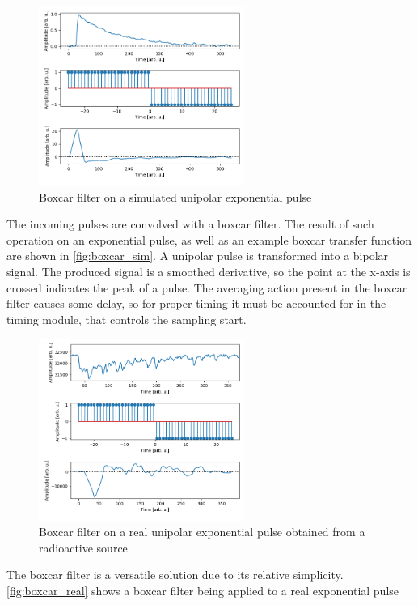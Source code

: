 \documentclass[12pt]{article}
\begin{document}
		\begin{figure}[!ht]
			\centering
			\includegraphics[width=0.60\textwidth]{img/boxcar_sim.png}
			\caption{Boxcar filter on a simulated unipolar exponential pulse}\label{fig:boxcar_sim}
		\end{figure}
		The incoming pulses are convolved with a boxcar filter. The result of such operation on 
		an exponential pulse, as well as an example boxcar transfer function are shown in \autoref{fig:boxcar_sim}.
		A unipolar pulse is transformed into a bipolar signal. The produced signal is a smoothed derivative, 
		so the point at the x-axis is crossed indicates the peak of a pulse.
		The averaging action present in the boxcar filter causes some delay, so for proper timing
		it must be accounted for in the timing module, that controls the sampling start.
		\newpage
		\begin{figure}[!h]
			\centering
			\includegraphics[width=0.60\textwidth]{img/boxcar_real.png}
			\caption{Boxcar filter on a real unipolar exponential pulse obtained from a radioactive source}\label{fig:boxcar_real}
		\end{figure}
		The boxcar filter is a versatile solution due to its relative simplicity. 
		\autoref{fig:boxcar_real} shows a boxcar filter being applied to a real exponential pulse
\end{document}
